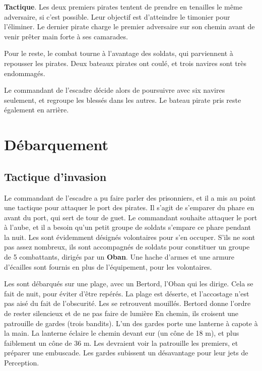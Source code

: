 \documentclass[a4paper,10pt,openany]{book}
\begin{document}
\begin{multicols}{2}
\begin{quotebox}
	\textbf{Tactique}. Les deux premiers pirates tentent de prendre en tenailles le même adversaire, si c’est possible. Leur objectif est d’atteindre le
	timonier pour l’éliminer. Le dernier pirate charge le premier adversaire sur son chemin avant de venir prêter main forte à ses camarades.
\end{quotebox}

Pour le reste, le combat tourne à l’avantage des soldats, qui parviennent à repousser les pirates. Deux bateaux pirates ont coulé, et trois navires
sont très endommagés.\par Le commandant de l’escadre décide alors de poursuivre avec six navires seulement, et regroupe les blessés dans les autres.
Le bateau pirate pris reste également en arrière.\par

\section{Débarquement}
\subsection{Tactique d’invasion}
Le commandant de l’escadre a pu faire parler des prisonniers, et il a mis au point une tactique pour attaquer le port des pirates. Il s’agit de
s’emparer du phare en avant du port, qui sert de tour de guet. Le commandant souhaite attaquer le port à l’aube, et il a besoin qu’un petit groupe de
soldats s’empare ce phare pendant la nuit. Les \PJs sont évidemment désignés volontaires pour s’en occuper. S’ils ne sont pas assez nombreux,
ils sont accompagnés de soldats pour constituer un groupe de 5 combattants, dirigés par un \textbf{Oban}. Une hache d’armes et une armure d’écailles
sont fournis en plus de l’équipement, pour les volontaires.\par Les \PJs sont débarqués sur une plage, avec un Bertord, l’Oban qui les dirige.
Cela se fait de nuit, pour éviter d’être repérés. La plage est déserte, et l’accostage n’est pas aisé du fait de l’obscurité. Les \PJs se
retrouvent mouillés. Bertord donne l’ordre de rester silencieux et de ne pas faire de lumière En chemin, ils croisent une patrouille de gardes (trois
bandits). L’un des gardes porte une lanterne à capote à la main. La lanterne éclaire le chemin devant eur (un cône de 18 m), et plus faiblement un
cône de 36 m. Les \PJs devraient voir la patrouille les premiers, et préparer une embuscade. Les gardes subissent un désavantage pour leur jets
de Perception.


\end{multicols}
\end{document}
